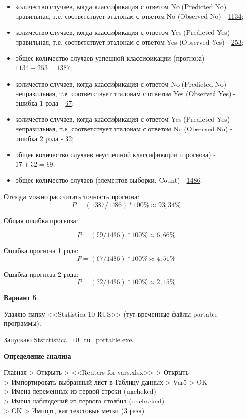 \begin{itemize}
  \item количество случаев, когда классификация с ответом No (Predicted No) правильная,
  т.е. соответствует эталонам с ответом No (Observed No) - \underline{1134};
  \item количество случаев, когда классификация с ответом Yes (Predicted Yes) правильная,
  т.е. соответствует эталонам с ответом Yes (Observed Yes) - \underline{253};
  \item общее количество случаев успешной классификации (прогноза) - \underline{$1134+253=1387$};
  \item количество случаев, когда классификация с ответом No (Predicted No)
  неправильная, т.е. соответствует эталонам с ответом Yes (Observed Yes) - ошибка 1
  рода - \underline{67};
  \item количество случаев, когда классификация с ответом Yes (Predicted Yes)
  неправильная, т.е. соответствует эталонам с ответом No (Observed No) - ошибка 2
  рода - \underline{32};
  \item общее количество случаев неуспешной классификации (прогноза) - \underline{$67+32=99$};
  \item общее количество случаев (элементов выборки, Count) - \underline{1486}.
\end{itemize}


Отсюда можно рассчитать точность прогноза:
$$
P = (1387 / 1486) * 100\% \approx 93,34\%
$$

Общая ошибка прогноза:

$$
P = (99 / 1486) * 100\% \approx 6,66\%
$$

Ошибка прогноза 1 рода:
$$
P = (67 / 1486) * 100\% \approx 4,51\%
$$

Ошибка прогноза 2 рода:
$$
P = (32 / 1486) * 100\% \approx 2,15\%
$$

\newpage

\begin{center}
  \textbf{Вариант 5}
\end{center}

Удаляю папку <<Statistica 10 RUS>> (тут временные файлы portable программы).

Запускаю Ststatistica\_10\_ru\_portable.exe.

\begin{center}
  \textbf{Определение анализа}
\end{center}

Главная > Открыть > <<Reuters for vars.xlsx>> > Открыть \\
> Импортировать выбранный лист в Таблицу данных > Var5 > OK \\
> Имена переменных из первой строки (uncheked) \\
> Имена наблюдений из первого столбца (unchecked) \\
> OK > Импорт, как текстовые метки (3 раза) \\

